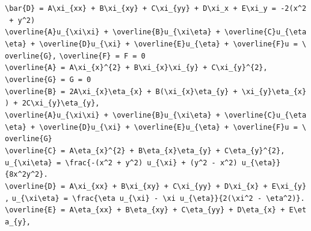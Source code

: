 \documentclass[
  ukrainian,
]{article}
\begin{document}
\texttt{\textbackslash{}bar\{D\}\ =\ A\textbackslash{}xi\_\{xx\}\ +\ B\textbackslash{}xi\_\{xy\}\ +\ C\textbackslash{}xi\_\{yy\}\ +\ D\textbackslash{}xi\_x\ +\ E\textbackslash{}xi\_y\ =\ -2(x\^{}2\ +\ y\^{}2)}
\texttt{\textbackslash{}overline\{A\}u\_\{\textbackslash{}xi\textbackslash{}xi\}\ +\ \textbackslash{}overline\{B\}u\_\{\textbackslash{}xi\textbackslash{}eta\}\ +\ \textbackslash{}overline\{C\}u\_\{\textbackslash{}eta\textbackslash{}eta\}\ +\ \textbackslash{}overline\{D\}u\_\{\textbackslash{}xi\}\ +\ \textbackslash{}overline\{E\}u\_\{\textbackslash{}eta\}\ +\ \textbackslash{}overline\{F\}u\ =\ \textbackslash{}overline\{G\},}
\texttt{\textbackslash{}overline\{F\}\ =\ F\ =\ 0}
\texttt{\textbackslash{}overline\{A\}\ =\ A\textbackslash{}xi\_\{x\}\^{}\{2\}\ +\ B\textbackslash{}xi\_\{x\}\textbackslash{}xi\_\{y\}\ +\ C\textbackslash{}xi\_\{y\}\^{}\{2\},}
\texttt{\textbackslash{}overline\{G\}\ =\ G\ =\ 0}
\texttt{\textbackslash{}overline\{B\}\ =\ 2A\textbackslash{}xi\_\{x\}\textbackslash{}eta\_\{x\}\ +\ B(\textbackslash{}xi\_\{x\}\textbackslash{}eta\_\{y\}\ +\ \textbackslash{}xi\_\{y\}\textbackslash{}eta\_\{x\})\ +\ 2C\textbackslash{}xi\_\{y\}\textbackslash{}eta\_\{y\},}
\texttt{\textbackslash{}overline\{A\}u\_\{\textbackslash{}xi\textbackslash{}xi\}\ +\ \textbackslash{}overline\{B\}u\_\{\textbackslash{}xi\textbackslash{}eta\}\ +\ \textbackslash{}overline\{C\}u\_\{\textbackslash{}eta\textbackslash{}eta\}\ +\ \textbackslash{}overline\{D\}u\_\{\textbackslash{}xi\}\ +\ \textbackslash{}overline\{E\}u\_\{\textbackslash{}eta\}\ +\ \textbackslash{}overline\{F\}u\ =\ \textbackslash{}overline\{G\}}
\texttt{\textbackslash{}overline\{C\}\ =\ A\textbackslash{}eta\_\{x\}\^{}\{2\}\ +\ B\textbackslash{}eta\_\{x\}\textbackslash{}eta\_\{y\}\ +\ C\textbackslash{}eta\_\{y\}\^{}\{2\},}
\texttt{u\_\{\textbackslash{}xi\textbackslash{}eta\}\ =\ \textbackslash{}frac\{-(x\^{}2\ +\ y\^{}2)\ u\_\{\textbackslash{}xi\}\ +\ (y\^{}2\ -\ x\^{}2)\ u\_\{\textbackslash{}eta\}\}\{8x\^{}2y\^{}2\}.}
\texttt{\textbackslash{}overline\{D\}\ =\ A\textbackslash{}xi\_\{xx\}\ +\ B\textbackslash{}xi\_\{xy\}\ +\ C\textbackslash{}xi\_\{yy\}\ +\ D\textbackslash{}xi\_\{x\}\ +\ E\textbackslash{}xi\_\{y\},}
\texttt{u\_\{\textbackslash{}xi\textbackslash{}eta\}\ =\ \textbackslash{}frac\{\textbackslash{}eta\ u\_\{\textbackslash{}xi\}\ -\ \textbackslash{}xi\ u\_\{\textbackslash{}eta\}\}\{2(\textbackslash{}xi\^{}2\ -\ \textbackslash{}eta\^{}2)\}.}
\texttt{\textbackslash{}overline\{E\}\ =\ A\textbackslash{}eta\_\{xx\}\ +\ B\textbackslash{}eta\_\{xy\}\ +\ C\textbackslash{}eta\_\{yy\}\ +\ D\textbackslash{}eta\_\{x\}\ +\ E\textbackslash{}eta\_\{y\},}
\end{document}
